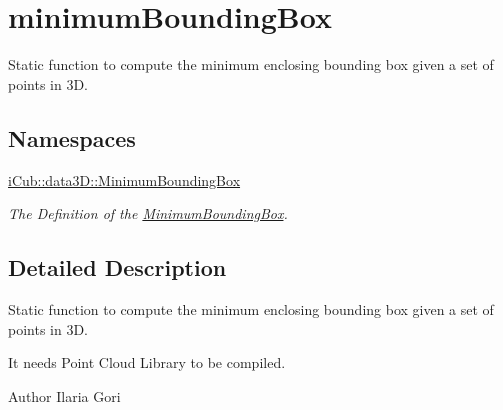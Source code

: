 \section{minimum\+Bounding\+Box}
\label{group__minimumBoundingBox}


Static function to compute the minimum enclosing bounding box given a set of points in 3D.  


\subsection*{Namespaces}
\begin{DoxyCompactItemize}
\item 
 \hyperlink{namespaceiCub_1_1data3D_1_1MinimumBoundingBox}{i\+Cub\+::data3\+D\+::\+Minimum\+Bounding\+Box}
\begin{DoxyCompactList}\small\item\em The Definition of the \hyperlink{namespaceiCub_1_1data3D_1_1MinimumBoundingBox}{Minimum\+Bounding\+Box}. \end{DoxyCompactList}\end{DoxyCompactItemize}


\subsection{Detailed Description}
Static function to compute the minimum enclosing bounding box given a set of points in 3D. 

It needs Point Cloud Library to be compiled.

\begin{DoxyAuthor}{Author}
Ilaria Gori 
\end{DoxyAuthor}
